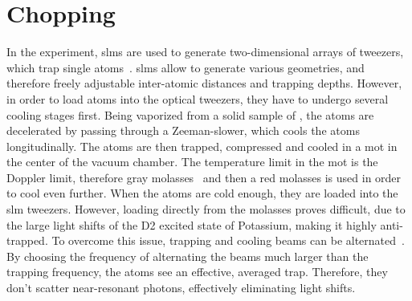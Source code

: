 \chapter{Chopping}%
\label{ch:chopping}


In the experiment, \acp{slm} are used to generate two-dimensional arrays of tweezers, which trap single atoms~\cite{Osterholz2020}. \acp{slm} allow to generate various geometries, and therefore freely adjustable inter-atomic distances and trapping depths. However, in order to load atoms into the optical tweezers, they have to undergo several cooling stages first. Being vaporized from a solid sample of , the atoms are decelerated by passing through a Zeeman-slower, which cools the atoms longitudinally. The atoms are then trapped, compressed and cooled in a \ac{mot} in the center of the vacuum chamber. The temperature limit in the \ac{mot} is the Doppler limit, therefore gray molasses~\cite{Salomon2013} and then a red molasses is used in order to cool even further. When the atoms are cold enough, they are loaded into the \ac{slm} tweezers. However, loading directly from the molasses proves difficult, due to the large light shifts of the D2 excited state of Potassium, making it highly anti-trapped. To overcome this issue, trapping and cooling beams can be alternated~\cite{Hutzler2017}. By choosing the frequency of alternating the beams much larger than the trapping frequency, the atoms see an effective, averaged trap. Therefore, they don't scatter near-resonant photons, effectively eliminating light shifts.

